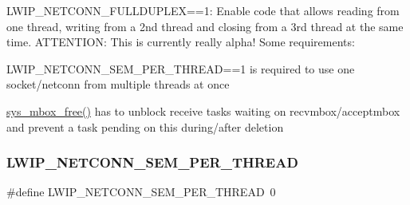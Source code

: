L\+W\+I\+P\+\_\+\+N\+E\+T\+C\+O\+N\+N\+\_\+\+F\+U\+L\+L\+D\+U\+P\+L\+EX==1\+: Enable code that allows reading from one thread, writing from a 2nd thread and closing from a 3rd thread at the same time. A\+T\+T\+E\+N\+T\+I\+ON\+: This is currently really alpha! Some requirements\+:
\begin{DoxyItemize}
\item L\+W\+I\+P\+\_\+\+N\+E\+T\+C\+O\+N\+N\+\_\+\+S\+E\+M\+\_\+\+P\+E\+R\+\_\+\+T\+H\+R\+E\+AD==1 is required to use one socket/netconn from multiple threads at once
\item \hyperlink{group__sys__mbox_gac641a45812155d2234ef80dd6412882f}{sys\+\_\+mbox\+\_\+free()} has to unblock receive tasks waiting on recvmbox/acceptmbox and prevent a task pending on this during/after deletion 
\end{DoxyItemize}\mbox{\label{group__lwip__opts__netconn_ga2543345adf7d2c307df78a54ac2ba8c4}} 
\subsubsection{\texorpdfstring{L\+W\+I\+P\+\_\+\+N\+E\+T\+C\+O\+N\+N\+\_\+\+S\+E\+M\+\_\+\+P\+E\+R\+\_\+\+T\+H\+R\+E\+AD}{LWIP\_NETCONN\_SEM\_PER\_THREAD}\hspace{0.1cm}{\footnotesize\ttfamily [1/2]}}
{\footnotesize\ttfamily \#define L\+W\+I\+P\+\_\+\+N\+E\+T\+C\+O\+N\+N\+\_\+\+S\+E\+M\+\_\+\+P\+E\+R\+\_\+\+T\+H\+R\+E\+AD~0}

